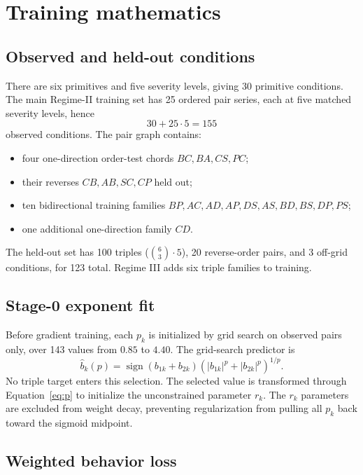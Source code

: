 \documentclass[11pt,a4paper]{article}
\newcommand{\sign}{\operatorname{sign}}
\begin{document}
\section{Training mathematics}

\subsection{Observed and held-out conditions}

There are six primitives and five severity levels, giving 30 primitive
conditions.  The main Regime-II training set has 25 ordered pair series, each
at five matched severity levels, hence
\[
30+25\cdot5=155
\]
observed conditions.  The pair graph contains:
\begin{itemize}
  \item four one-direction order-test chords $BC,BA,CS,PC$;
  \item their reverses $CB,AB,SC,CP$ held out;
  \item ten bidirectional training families $BP,AC,AD,AP,DS,AS,BD,BS,DP,PS$;
  \item one additional one-direction family $CD$.
\end{itemize}
The held-out set has 100 triples ($\binom63\cdot5$), 20 reverse-order pairs,
and 3 off-grid conditions, for 123 total.  Regime III adds six triple families
to training.

\subsection{Stage-0 exponent fit}

Before gradient training, each $p_k$ is initialized by grid search on observed
pairs only, over 143 values from $0.85$ to $4.40$.  The grid-search predictor is
\begin{equation}
\widehat b_k(p)=\sign(b_{1k}+b_{2k})
\left(|b_{1k}|^p+|b_{2k}|^p\right)^{1/p}.
\end{equation}
No triple target enters this selection.  The selected value is transformed
through Equation~\eqref{eq:p} to initialize the unconstrained parameter $r_k$.
The $r_k$ parameters are excluded from weight decay, preventing regularization
from pulling all $p_k$ back toward the sigmoid midpoint.

\subsection{Weighted behavior loss}
\end{document}

